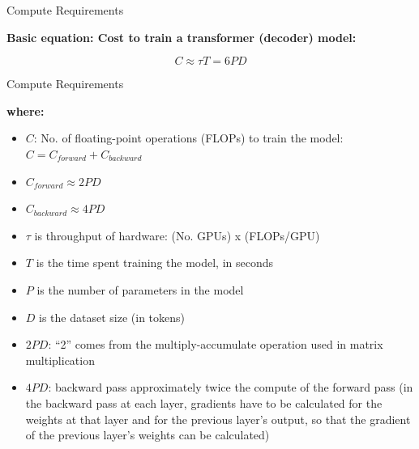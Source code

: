 
\begin{vbframe}{Compute Requirements}

\vfill

\textbf{Basic equation: Cost to train a transformer (decoder) model:}

\vspace{1.5cm}

$$C \approx \tau T = 6 P D$$ 

\vspace{1.5cm}

\centering {}

\vfill

\end{vbframe}


\begin{vbframe}{Compute Requirements}

\vfill

\textbf{where:}

\begin{itemize}
    \item $C$: No. of floating-point operations (FLOPs) to train the model:\\
          $C = C_{forward} + C_{backward}$
	\item $C_{forward} \approx 2 P D$
	\item $C_{backward} \approx 4 P D$
	\item $\tau$ is throughput of hardware: (No. GPUs) x (FLOPs/GPU)
	\item $T$ is the time spent training the model, in seconds
	\item $P$ is the number of parameters in the model
	\item $D$ is the dataset size (in tokens)
\item $2PD$: ``2'' comes from the multiply-accumulate
          operation used in
          matrix multiplication
          \item $4PD$: backward pass approximately twice
          the compute of the forward pass
          (in the backward pass at each
          layer, gradients have to be calculated for the
          weights at that layer and for the previous layer's
          output, so that the gradient of the previous
          layer's weights can be calculated)
          
\end{itemize}

\vfill

\end{vbframe}

